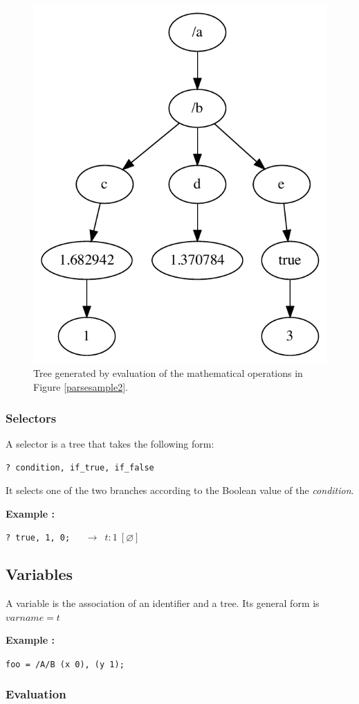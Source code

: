 \documentclass{article}
\newcommand{\exemple}	{\vspace*{1mm}\hspace*{-4mm}\textbf{Example :}}
\newcommand{\code}	[2][0.9]		{\vspace{0mm}\begin{center}\colorbox{mygrey}{
							\begin{minipage}[t]{#1\columnwidth} 
							{\small \texttt{#2}}
							\end{minipage}}\end{center}}
\newcommand{\nulltree}	{\ensuremath{\varnothing}}
\begin{document}
\begin{figure}[htbp]
\begin{center}
\includegraphics[width=0.7\columnwidth]{eval/sample3}
\caption{Tree generated by evaluation of the mathematical operations in Figure \ref{parsesample2}.}
\label{treesample2}
\end{center}
\end{figure}


\subsubsection{Selectors}

A selector is a tree that takes the following form:
\code{? condition, if\_true, if\_false}
It selects one of the two branches according to the Boolean value of the \emph {condition}.

\exemple
\code{? true, 1, 0; \ \  $\to$ $t : 1\ [\nulltree]$}


\subsection{Variables}

A variable is the association of an identifier and a tree. Its general form is
$varname = t$

\exemple
\code{foo = /A/B (x 0), (y 1); }

\subsubsection{Evaluation}
\end{document}
